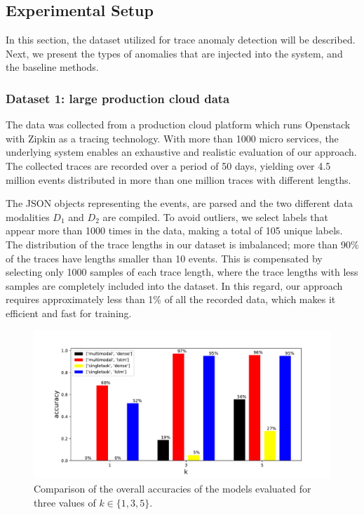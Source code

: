 \subsection{Experimental Setup}
In this section, the dataset utilized for trace anomaly detection will be described. Next, we present the types of anomalies that are injected into the system, and the baseline methods.

\subsubsection{Dataset 1: large production cloud data}
The data was collected from a production cloud platform which runs Openstack \cite{ShrivastwaOpenstack} with Zipkin \cite{openzipkin} as a tracing technology. With more than 1000 micro services, the underlying system enables an exhaustive and realistic evaluation of our approach. The collected traces are recorded over a period of 50 days, yielding over 4.5 million events distributed in more than one million traces with different lengths. 

The JSON objects representing the events, are parsed and the two different data modalities $D_1$ and $D_2$ are compiled. To avoid outliers, we select labels that appear more than 1000 times in the data, making a total of 105 unique labels. The distribution of the trace lengths in our dataset is imbalanced; more than 90\% of the traces have lengths smaller than 10 events. This is compensated by selecting only 1000 samples of each trace length, where the trace lengths with less samples are completely included into the dataset. In this regard, our approach requires approximately less than 1\% of all the recorded data, which makes it efficient and fast for training. 

\begin{figure}[htbp]
\centerline{\includegraphics[width=1.0\textwidth]{gfx/chap5/groupbyk.pdf}}
\caption{Comparison of the overall accuracies of the models evaluated for three values of $k \in \{1, 3, 5\}$.}
\label{k}
\end{figure}

